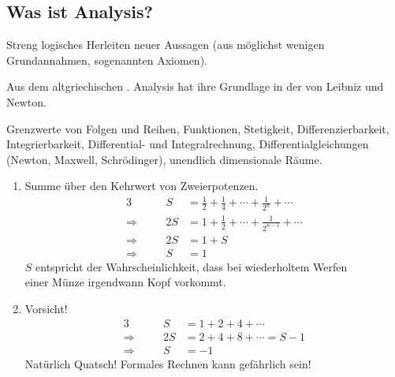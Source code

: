 \documentclass[../ana2.tex]{subfiles}
\begin{document}
\setcounter{section}{0}

\begin{prosa}

\section{Was ist Analysis?}

\begin{description}[style=nextline]
	\item[Mathematik]
		Streng logisches Herleiten neuer Aussagen (aus möglichst wenigen\\ Grundannahmen, sogenannten Axiomen).
	\item[Analysis]
		Aus dem altgriechischen . Analysis hat ihre Grundlage in der  von Leibniz und Newton.
	\item[Zentrale Begriffe]
		Grenzwerte von Folgen und Reihen, Funktionen, Stetigkeit, Differenzierbarkeit, Integrierbarkeit, Differential- und Integralrechnung, Differentialgleichungen
		(Newton, Maxwell, Schrödinger), unendlich dimensionale Räume.
\end{description}

\begin{bspe}\leavevmode
	\begin{enumerate}[(1)]
		\item Summe über den Kehrwert von Zweierpotenzen.
			\begin{alignat*}{3}
							   &&             S &= \frac{1}{2} + \frac{1}{4} + \cdots + \frac{1}{2^{n}} + \cdots \\
				\Longrightarrow&\quad& 		 2S &= 1 + \frac{1}{2} + \cdots + \frac{1}{2^{n-1}} + \cdots \\
				\Longrightarrow&\quad& 	     2S &= 1 + S \\
				\Longrightarrow&&             S &= 1
			\end{alignat*}
			\(S\) entspricht der Wahrscheinlichkeit, dass bei wiederholtem Werfen \\
			einer Münze irgendwann Kopf vorkommt.\\
		\item Vorsicht!
			\begin{alignat*}{3}
							   &&       S &= 1 + 2 + 4 + \cdots \\
				\Longrightarrow&\quad& 2S &= 2 + 4 + 8 + \cdots = S - 1\\
				\Longrightarrow&\quad&  S &= \minus 1
			\end{alignat*}
			Natürlich Quatsch! Formales Rechnen kann gefährlich sein!
	\end{enumerate}
\end{bspe}


\end{prosa}
\end{document}
